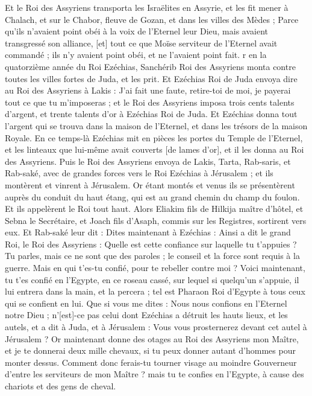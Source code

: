 \begin{multicols}{2}
Et le Roi des Assyriens transporta les Israëlites en Assyrie, et les fit mener à Chalach, et sur le Chabor, fleuve de Gozan, et dans les villes des Mèdes ;
Parce qu'ils n'avaient point obéi à la voix de l'Eternel leur Dieu, mais avaient transgressé son alliance, [et] tout ce que Moïse serviteur de l'Eternel avait commandé ; ils n'y avaient point obéi, et ne l'avaient point fait.
r en la quatorzième année du Roi Ezéchias, Sanchérib Roi des Assyriens monta contre toutes les villes fortes de Juda, et les prit.
Et Ezéchias Roi de Juda envoya dire au Roi des Assyriens à Lakis : J'ai fait une faute, retire-toi de moi, je payerai tout ce que tu m'imposeras ; et le Roi des Assyriens imposa trois cents talents d'argent, et trente talents d'or à Ezéchias Roi de Juda.
Et Ezéchias donna tout l'argent qui se trouva dans la maison de l'Eternel, et dans les trésors de la maison Royale.
En ce temps-là Ezéchias mit en pièces les portes du Temple de l'Eternel, et les linteaux que lui-même avait couverts [de lames d'or], et il les donna au Roi des Assyriens.
Puis le Roi des Assyriens envoya de Lakis, Tarta, Rab-saris, et Rab-saké, avec de grandes forces vers le Roi Ezéchias à Jérusalem ; et ils montèrent et vinrent à Jérusalem. Or étant montés et venus ils se présentèrent auprès du conduit du haut étang, qui est au grand chemin du champ du foulon.
Et ils appelèrent le Roi tout haut. Alors Eliakim fils de Hilkija maître d'hôtel, et Sebna le Secrétaire, et Joach fils d'Asaph, commis sur les Registres, sortirent vers eux.
Et Rab-saké leur dit : Dites maintenant à Ezéchias : Ainsi a dit le grand Roi, le Roi des Assyriens : Quelle est cette confiance sur laquelle tu t'appuies ?
Tu parles, mais ce ne sont que des paroles ; le conseil et la force sont requis à la guerre. Mais en qui t'es-tu confié, pour te rebeller contre moi ?
Voici maintenant, tu t'es confié en l'Egypte, en ce roseau cassé, sur lequel si quelqu'un s'appuie, il lui entrera dans la main, et la percera ; tel est Pharaon Roi d'Egypte à tous ceux qui se confient en lui.
Que si vous me dites : Nous nous confions en l'Eternel notre Dieu ; n'[est]-ce pas celui dont Ezéchias a détruit les hauts lieux, et les autels, et a dit à Juda, et à Jérusalem : Vous vous prosternerez devant cet autel à Jérusalem ?
Or maintenant donne des otages au Roi des Assyriens mon Maître, et je te donnerai deux mille chevaux, si tu peux donner autant d'hommes pour monter dessus.
Comment donc ferais-tu tourner visage au moindre Gouverneur d'entre les serviteurs de mon Maître ? mais tu te confies en l'Egypte, à cause des chariots et des gens de cheval.

\end{multicols}
